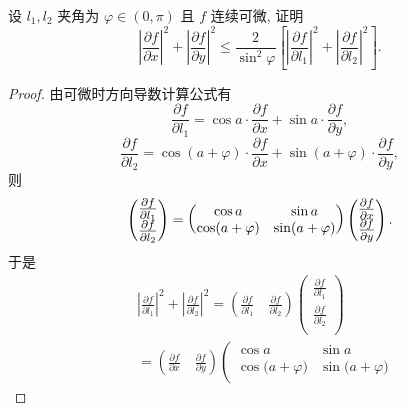 \documentclass[../../main.tex]{subfiles}
\begin{document}
\begin{example}
设 \( l_1, l_2 \) 夹角为 \( \varphi \in (0, \pi) \) 且 \( f \) 连续可微, 证明
\[
\left| \frac{\partial f}{\partial x} \right|^2 + \left| \frac{\partial f}{\partial y} \right|^2 \leqslant \frac{2}{\sin^2 \varphi} \left[ \left| \frac{\partial f}{\partial l_1} \right|^2 + \left| \frac{\partial f}{\partial l_2} \right|^2 \right] .
\]
\end{example}
\begin{proof}
由可微时方向导数计算公式有
\[
\frac{\partial f}{\partial l_1} = \cos a \cdot \frac{\partial f}{\partial x} + \sin a \cdot \frac{\partial f}{\partial y},
\]
\[
\frac{\partial f}{\partial l_2} = \cos (a + \varphi) \cdot \frac{\partial f}{\partial x} + \sin (a + \varphi) \cdot \frac{\partial f}{\partial y},
\]
则
\begin{align*}
\begin{large}
\begin{pmatrix}
{\textstyle \frac{\partial f}{\partial l_1} }\\
{\textstyle \frac{\partial f}{\partial l_2}}
\end{pmatrix}
\end{large}
=
\begin{pmatrix}
\cos a & \sin a \\
\cos (a + \varphi) & \sin (a + \varphi)
\end{pmatrix}
\begin{large}
\begin{pmatrix}
{\textstyle \frac{\partial f}{\partial x}} \\
{\textstyle \frac{\partial f}{\partial y}}
\end{pmatrix}
\end{large}.
\end{align*}
于是
\[
\begin{aligned}
&\left| \frac{\partial f}{\partial l_1} \right|^2+\left| \frac{\partial f}{\partial l_2} \right|^2=\left( \frac{\partial f}{\partial l_1}\quad \frac{\partial f}{\partial l_2} \right) \left( \begin{array}{c}
\frac{\partial f}{\partial l_1}\\
\frac{\partial f}{\partial l_2}\\
\end{array} \right) 
\\
&=\left( \frac{\partial f}{\partial x}\quad \frac{\partial f}{\partial y} \right) \left( \begin{matrix}
\cos a&		\sin a\\
\cos\mathrm{(}a+\varphi )&		\sin\mathrm{(}a+\varphi )\\

\end{matrix}
\end{aligned}\]
\end{proof}
\end{document}
